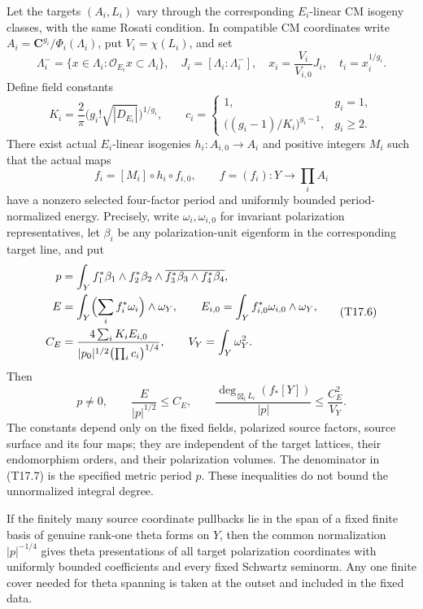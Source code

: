 \documentclass[11pt,a4paper]{article}
\theoremstyle{definition}
\begin{document}
Let the targets \((A_i,L_i)\) vary through the corresponding \(E_i\)-linear CM isogeny classes, with the same Rosati condition. In compatible CM coordinates write \(A_i=\mathbf C^{g_i}/\Phi_i(\Lambda_i)\), put \(V_i=\chi(L_i)\), and set \[
\Lambda_i^- =\{x\in\Lambda_i:\mathcal O_{E_i}x\subset\Lambda_i\},\quad
J_i=[\Lambda_i:\Lambda_i^-],\quad
x_i=\frac{V_i}{V_{i,0}}J_i,\quad t_i=x_i^{1/g_i}.
\tag{T17.3}
\] Define field constants \[
K_i=\frac2\pi\bigl(g_i!\sqrt{|D_{E_i}|}\bigr)^{1/g_i},\qquad
c_i=
\begin{cases}
1,&g_i=1,\\
\bigl((g_i-1)/K_i\bigr)^{g_i-1},&g_i\ge2.
\end{cases}
\tag{T17.4}
\] There exist actual \(E_i\)-linear isogenies \(h_i:A_{i,0}\to A_i\) and positive integers \(M_i\) such that the actual maps \[
f_i=[M_i]\circ h_i\circ f_{i,0},\qquad f=(f_i):Y\to\prod_iA_i
\tag{T17.5}
\] have a nonzero selected four-factor period and uniformly bounded period-normalized energy. Precisely, write \(\omega_i,\omega_{i,0}\) for invariant polarization representatives, let \(\beta_i\) be any polarization-unit eigenform in the corresponding target line, and put \[
\begin{aligned}
p&=\int_Yf_1^*\beta_1\wedge f_2^*\beta_2
                   \wedge\overline{f_3^*\beta_3\wedge f_4^*\beta_4},\\
E&=\int_Y\Bigl(\sum_i f_i^*\omega_i\Bigr)\wedge\omega_Y,\qquad
E_{i,0}=\int_Y f_{i,0}^*\omega_{i,0}\wedge\omega_Y,\\
C_E&=\frac{4\sum_iK_iE_{i,0}}
               {|p_0|^{1/2}\bigl(\prod_i c_i\bigr)^{1/4}},\qquad
V_Y=\int_Y\omega_Y^2.
\end{aligned}
\tag{T17.6}
\] Then \[
p\ne0,\qquad \frac{E}{|p|^{1/2}}\le C_E,
\qquad
\frac{\deg_{\boxtimes_iL_i}(f_*[Y])}{|p|}
\le\frac{C_E^2}{V_Y}.
\tag{T17.7}
\] The constants depend only on the fixed fields, polarized source factors, source surface and its four maps; they are independent of the target lattices, their endomorphism orders, and their polarization volumes. The denominator in (T17.7) is the specified metric period \(p\). These inequalities do not bound the unnormalized integral degree.

If the finitely many source coordinate pullbacks lie in the span of a fixed finite basis of genuine rank-one theta forms on \(Y\), then the common normalization \(|p|^{-1/4}\) gives theta presentations of all target polarization coordinates with uniformly bounded coefficients and every fixed Schwartz seminorm. Any one finite cover needed for theta spanning is taken at the outset and included in the fixed data.
\end{document}
